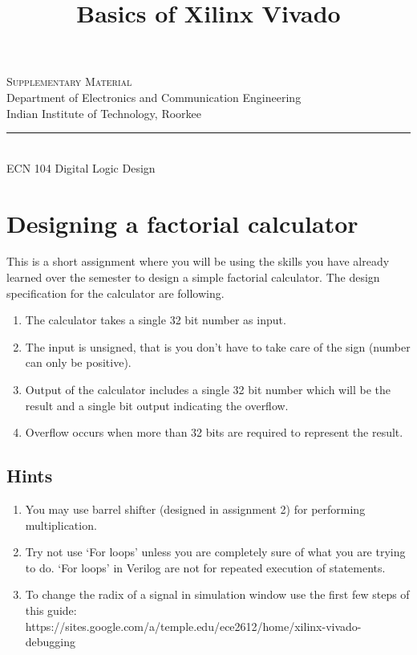 \documentclass[a4paper,10pt]{article}
\newcommand{\linia}{\rule{\linewidth}{0.5pt}}
\theoremstyle{mytheor}
\newcommand{\antitle}{\text{Basics of Xilinx Vivado}}
\renewcommand{\maketitle}{
\begin{center}
  \vspace{2ex} {\textsc{{{\large}Supplementary Material}\vspace{0.1cm}
      \break \huge \antitle}} \vspace{1ex}
  \\

Department of Electronics and Communication Engineering \\
Indian Institute of Technology, Roorkee
\linia\\
ECN 104 \hfill Digital Logic Design
\vspace{4ex}
\end{center}
}
\begin{document}
\title{Basics of Xilinx Vivado}

\maketitle
\section*{Designing a factorial calculator}
This is a short assignment where you will be using the skills you have
already learned over the semester to design a simple factorial
calculator. The design specification for the calculator are following.

\begin{enumerate}
\item The calculator takes a single 32 bit number as input.
\item The input is unsigned, that is you don't have to take care of
  the sign (number can only be positive).
\item Output of the calculator includes a single 32 bit number which
  will be the result and a single bit output indicating the overflow.
\item Overflow occurs when more than 32 bits are required to represent
  the result.
\end{enumerate}

\subsection*{Hints}
\begin{enumerate}
\item You may use barrel shifter (designed in assignment 2) for
  performing multiplication.
\item Try not use `For loops' unless you are completely sure of what
  you are trying to do. `For loops' in Verilog are not for repeated
  execution of statements.
\item To change the radix of a signal in simulation window use the
  first few steps of this guide:\\
  https://sites.google.com/a/temple.edu/ece2612/home/xilinx-vivado-debugging
\end{enumerate}
\end{document}
